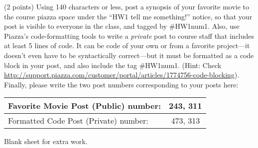 \documentclass[11pt]{article}
\begin{document}
\newpage
\begin{problems}
\item (2 points)
    Using 140 characters or less, post a synopsis of your favorite movie to the
    course piazza space under the ``HW1 tell me something!'' notice, so that
    your post is visible to everyone in the class, and tagged by \#HW1num1.
    Also, use Piazza's code-formatting tools to write a {\em private} post to
    course staff that includes at least 5 lines of code. It can be code of your
    own or from a favorite project---it doesn't even have to be syntactically
    correct---but it must be formatted as a code block in your post, and also
    include the tag \#HW1num1. (Hint: Check
    \url{http://support.piazza.com/customer/portal/articles/1774756-code-blocking}).
    Finally, please write the two post numbers corresponding to your posts here:

    \begin{table}[h]
        \begin{center}
            \begin{tabular}{|l|c|}
                \hline
                Favorite Movie Post (Public) number: & {243, 311} \\ \hline
                Formatted Code Post (Private) number: & {473, 313} \\ \hline
            \end{tabular}
        \end{center}
    \end{table}







\end{problems}

\newpage
Blank sheet for extra work.
\end{document}
